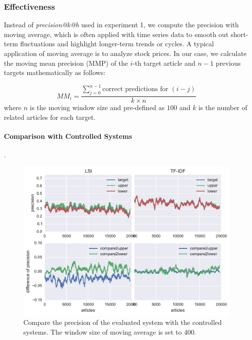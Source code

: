 \subsubsection{Effectiveness}

Instead of \textit{precision@k@h} used in experiment 1, we compute the precision with moving average, which is often applied with time series data to smooth out short-term fluctuations and highlight longer-term trends or cycles. A typical application of moving average is to analyze stock prices. In our case, we calculate the moving mean precision (MMP) of the $i$-th target article and $n-1$ previous targets mathematically as follows:

\begin{equation}
    MM_{i} = \frac{\sum^{n-1}_{j=0} \text{correct predictions for }(i-j)}{k\times n}
\end{equation}
where $n$ is the moving window size and pre-defined as $100$ and $k$ is the number of related articles for each target. 

\paragraph{Comparison with Controlled Systems}.

\begin{figure}[!htb]
    \centering
    \includegraphics[width=\textwidth]{fig/precision_inc}
    \caption{Compare the precision of the evaluated system with the controlled systems. The window size of moving average is set to $400$.}
    \label{fig:predict_inc}
\end{figure}

